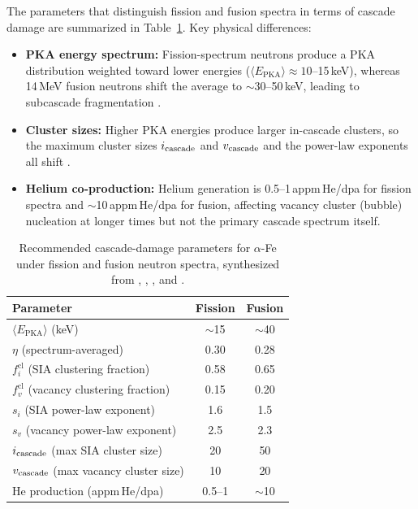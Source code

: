\documentclass[pdflatex,sn-basic]{sn-jnl} %
\begin{document}
The parameters that distinguish fission and fusion spectra in terms of
cascade damage are summarized in
Table~\ref{tab:spectrum_params}.  Key physical differences:

\begin{itemize}
  \item \textbf{PKA energy spectrum:} Fission-spectrum neutrons produce
    a PKA distribution weighted toward lower energies
    ($\langle E_{\mathrm{PKA}}\rangle \approx 10$--15\,keV), whereas
    14\,MeV fusion neutrons shift the average to $\sim$30--50\,keV,
    leading to subcascade fragmentation
    \cite{DeBacker2018FragmentedCascades,Zarkadoula2013NatureHighEnergyFe}.
  \item \textbf{Cluster sizes:} Higher PKA energies produce larger
    in-cascade clusters, so the maximum cluster sizes $i_{\rm cascade}$ and $v_{\rm cascade}$
    and the power-law exponents all shift
    \cite{Stoller2000RoleCascadeEnergyTemperature,
    Calder2010LargeInterstitialOrigin}.
  \item \textbf{Helium co-production:}  Helium generation is
    0.5--1\,appm\,He/dpa for fission spectra and $\sim$10\,appm\,He/dpa
    for fusion, affecting vacancy cluster (bubble) nucleation at longer
    times but not the primary cascade spectrum itself.
\end{itemize}

\begin{table}[htbp]
\centering
\caption{Recommended cascade-damage parameters for $\alpha$-Fe under
fission and fusion neutron spectra, synthesized from
\cite{Stoller2000RoleCascadeEnergyTemperature},
\cite{Nordlund2018PrimaryDamageReview},
\cite{DeBacker2018FragmentedCascades}, and
\cite{Malerba2021PureFeParameters}.}
\label{tab:spectrum_params}
\begin{tabular}{l c c}
\toprule
\textbf{Parameter} & \textbf{Fission} & \textbf{Fusion} \\
\midrule
$\langle E_{\mathrm{PKA}}\rangle$ (keV) & $\sim$15 & $\sim$40 \\
$\eta$ (spectrum-averaged)               & 0.30     & 0.28 \\
$f_i^{\mathrm{cl}}$ (SIA clustering fraction)        & 0.58 & 0.65 \\
$f_v^{\mathrm{cl}}$ (vacancy clustering fraction)    & 0.15 & 0.20 \\
$s_i$ (SIA power-law exponent)           & 1.6      & 1.5 \\
$s_v$ (vacancy power-law exponent)       & 2.5      & 2.3 \\
$i_{\rm cascade}$ (max SIA cluster size)             & 20       & 50 \\
$v_{\rm cascade}$ (max vacancy cluster size)         & 10       & 20 \\
He production (appm\,He/dpa)             & 0.5--1   & $\sim$10 \\
\bottomrule
\end{tabular}
\end{table}
\end{document}
